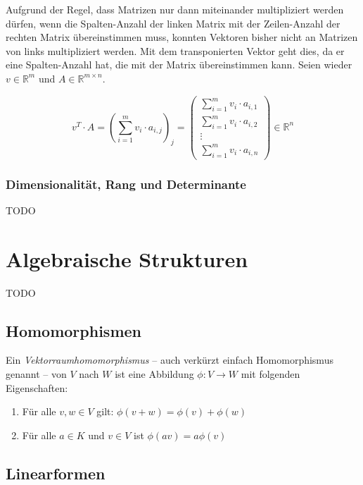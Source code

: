 Aufgrund der Regel, dass Matrizen nur dann miteinander multipliziert werden dürfen, wenn die Spalten-Anzahl der linken Matrix mit der Zeilen-Anzahl der rechten Matrix übereinstimmen muss, konnten Vektoren bisher nicht an Matrizen von links multipliziert werden. Mit dem transponierten Vektor geht dies, da er eine Spalten-Anzahl hat, die mit der Matrix übereinstimmen kann. Seien wieder $v\in \mathbb{R}^m$ und $A\in \mathbb{R}^{m\times n}$.

\[
v^T \cdot A = (\sum_{i=1}^{m}v_i\cdot a_{i,j})_{j} = \begin{pmatrix}
\sum_{i=1}^{m}v_i\cdot a_{i,1} \\
\sum_{i=1}^{m}v_i\cdot a_{i,2} \\
\vdots \\
\sum_{i=1}^{m}v_i\cdot a_{i,n}
\end{pmatrix} \in \mathbb{R}^n
\]

\subsubsection{Dimensionalität, Rang und Determinante}

TODO

\section{Algebraische Strukturen}

TODO

\subsection{Homomorphismen}

\begin{definition}

Ein \textsl{Vektorraumhomomorphismus} -- auch verkürzt einfach Homomorphismus genannt -- von $V$ nach $W$ ist eine Abbildung $\phi : V \longrightarrow W$ mit folgenden Eigenschaften:
\begin{enumerate}
\item Für alle $v,w \in V$ gilt: $\phi(v+w) = \phi(v)+\phi(w)$
\item Für alle $a\in K$ und $v\in V$ ist $\phi(av)=a\phi(v)$
\end{enumerate}
\end{definition}

\subsection{Linearformen}

